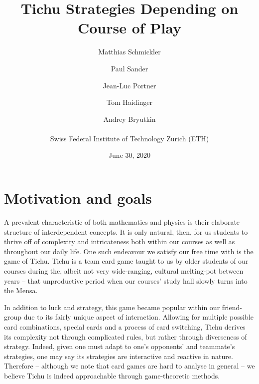 


\usepackage{multirow}
\usepackage{listings}
\usepackage{commath}
\usepackage{subcaption}
\usepackage{stfloats}

\makeatletter
\renewcommand\paragraph{\@startsection{paragraph}{4}{\z@}%
                                    {3pt  \@plus 1pt \@minus 1pt}%
                                    {-1em}%
                                    {\normalfont\normalsize\bfseries}}

\makeatother



\title{\textbf{Tichu Strategies Depending on Course of Play}}
\date{June 30, 2020}
\author{Matthias Schmickler \and Paul Sander \and Jean-Luc Portner \and Tom Haidinger \and Andrey Bryutkin \\ \\ Swiss Federal Institute of Technology Zurich (ETH)}
\maketitle

\section*{Motivation and goals}

A prevalent characteristic of both mathematics and physics is their elaborate structure of interdependent concepts. It is only natural, then, for us students to thrive off of complexity and intricateness both within our courses as well as throughout our daily life. One such endeavour we satisfy our free time with is the game of Tichu. Tichu is a team card game taught to us by older students of our courses during the, albeit not very wide-ranging, cultural melting-pot between years – that unproductive period when our courses’ study hall slowly turns into the Mensa. 

    In addition to luck and strategy, this game became popular within our friend-group due to its fairly unique aspect of interaction. Allowing for multiple possible card combinations, special cards and a process of card switching, Tichu derives its complexity not through complicated rules, but rather through diverseness of strategy. Indeed, given one must adapt to one’s opponents’ and teammate’s strategies, one may say its strategies are interactive and reactive in nature. Therefore – although we note that card games are hard to analyse in general – we believe Tichu is indeed approachable through game-theoretic methods. 

